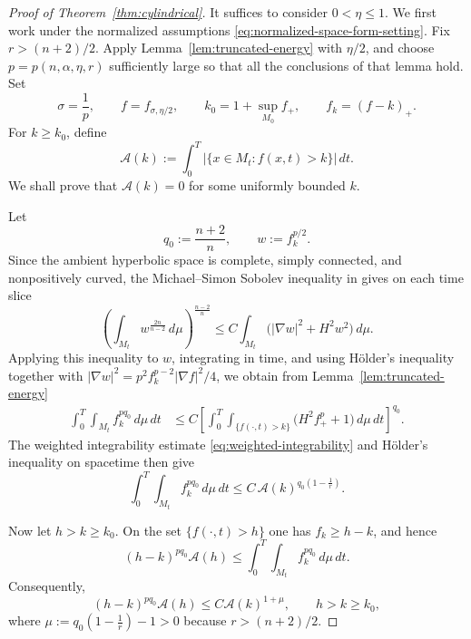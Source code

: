 \documentclass[11pt,reqno]{amsart}
\theoremstyle{definition}
\theoremstyle{remark}
\numberwithin{equation}{section}
\begin{document}
\begin{proof}[Proof of Theorem~\ref{thm:cylindrical}]
It suffices to consider $0<\eta\leq1$.  We first work under the normalized
assumptions \eqref{eq:normalized-space-form-setting}.  Fix $r>(n+2)/2$.  
Apply Lemma~\ref{lem:truncated-energy} with $\eta/2$, and choose
$p=p(n,\alpha,\eta,r)$ sufficiently large so that all the conclusions of that
lemma hold.  Set
\begin{equation*}
 \sigma=\frac1p,
 \qquad
 f=f_{\sigma,\eta/2},
 \qquad
 k_0=1+\sup_{M_0}f_+,
 \qquad
 f_k=(f-k)_+.
\end{equation*}
For $k\geq k_0$, define
\begin{equation*}
 \mathcal A(k)
 :=
 \int_0^T
 \bigl|\{x\in M_t:f(x,t)>k\}\bigr|\,dt.
\end{equation*}
We shall prove that $\mathcal A(k)=0$ for some uniformly bounded $k$.

Let
\begin{equation*}
 q_0:=\frac{n+2}{n},
 \qquad
 w:=f_k^{p/2}.
\end{equation*}
Since the ambient hyperbolic space is complete, simply connected, and
nonpositively curved, the Michael--Simon Sobolev inequality in \cites{HoffmanSpruck74,HoffmanSpruck75} gives on each time slice
\begin{equation*}
 \left(
 \int_{M_t}w^{\frac{2n}{n-2}}\,d\mu
 \right)^{\frac{n-2}{n}}
 \leq
 C\int_{M_t}\bigl(|\nabla w|^2+H^2w^2\bigr)\,d\mu.
\end{equation*}
Applying this inequality to $w$, integrating in time, and using H\"older's
inequality together with
$|\nabla w|^2=p^2f_k^{p-2}|\nabla f|^2/4$, we obtain from
Lemma~\ref{lem:truncated-energy}
\begin{align}
 \int_0^T\!\!\int_{M_t}f_k^{pq_0}\,d\mu\,dt
 &\leq
 C\left[
 \int_0^T
 \int_{\{f(\cdot,t)>k\}}
 \bigl(H^2f_+^p+1\bigr)\,d\mu\,dt
 \right]^{q_0}.
 \label{eq:stampacchia-parabolic-estimate}
\end{align}
The weighted integrability estimate \eqref{eq:weighted-integrability} and
H\"older's inequality on spacetime then give
\begin{equation*}
 \int_0^T\!\!\int_{M_t}f_k^{pq_0}\,d\mu\,dt
 \leq
 C\,\mathcal A(k)^{q_0(1-\frac1r)}.
\end{equation*}

Now let $h>k\geq k_0$.  On the set $\{f(\cdot,t)>h\}$ one has
$f_k\geq h-k$, and hence
\begin{equation*}
 (h-k)^{pq_0}\mathcal A(h)
 \leq
 \int_0^T\!\!\int_{M_t}f_k^{pq_0}\,d\mu\,dt.
\end{equation*}
Consequently,
\begin{equation}\label{eq:stampacchia-recursion}
 (h-k)^{pq_0}\mathcal A(h)
 \leq
 C\mathcal A(k)^{1+\mu},
 \qquad h>k\geq k_0,
\end{equation}
where $ \mu
 := q_0\left(1-\frac1r\right)-1>0$  
because $r>(n+2)/2$.


\end{proof}
\end{document}
